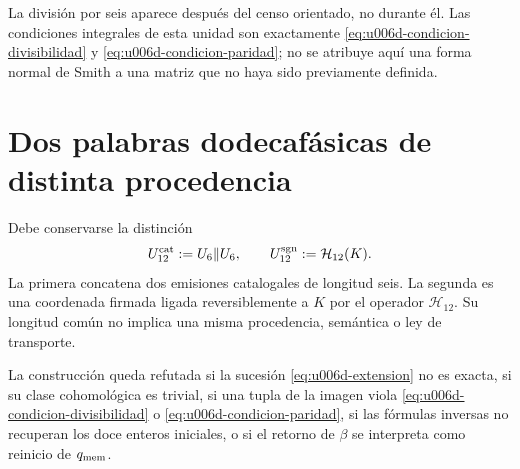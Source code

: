 La división por seis aparece después del censo orientado, no durante él. Las
condiciones integrales de esta unidad son exactamente
\eqref{eq:u006d-condicion-divisibilidad} y
\eqref{eq:u006d-condicion-paridad}; no se atribuye aquí una forma normal de
Smith a una matriz que no haya sido previamente definida.

\section{Dos palabras dodecafásicas de distinta procedencia}

Debe conservarse la distinción
\begin{equation}
 U_{12}^{\rm cat}:=U_6\Vert U_6,
 \qquad
 U_{12}^{\rm sgn}:=\mathcal H_{12}(K).
 \label{eq:u006d-dos-palabras-doce}
\end{equation}
La primera concatena dos emisiones catalogales de longitud seis. La segunda
es una coordenada firmada ligada reversiblemente a \(K\) por el operador
\(\mathcal H_{12}\). Su longitud común no implica una misma procedencia,
semántica o ley de transporte.

\begin{criterion}
\label{crit:u006d-refutacion}
La construcción queda refutada si la sucesión
\eqref{eq:u006d-extension} no es exacta, si su clase cohomológica es
trivial, si una tupla de la imagen viola
\eqref{eq:u006d-condicion-divisibilidad} o
\eqref{eq:u006d-condicion-paridad}, si las fórmulas inversas no recuperan
los doce enteros iniciales, o si el retorno de \(\beta\) se interpreta como
reinicio de \(q_{\rm mem}\).
\end{criterion}
